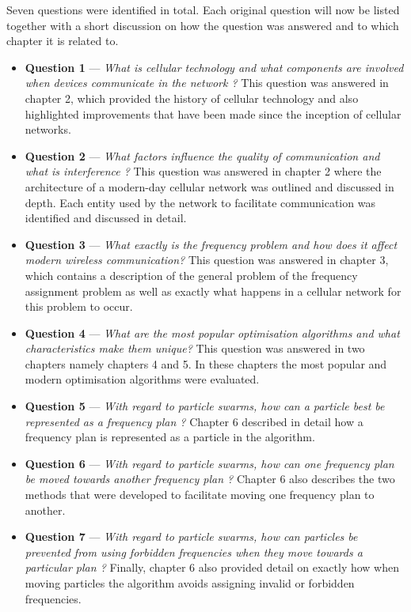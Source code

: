 Seven questions were identified in total. Each original question will now be listed together with a short discussion on how the question was answered and to which chapter it is related to.
\begin{itemize}
\item \textbf{Question 1} --- \emph{What is cellular technology and what components are involved when devices communicate in the network ?} This question was answered in chapter 2, which provided the history of cellular technology and also highlighted improvements that have been made since the inception of cellular networks.
\item \textbf{Question 2} --- \emph{What factors influence the quality of communication and what is interference ?} This question was answered in chapter 2 where the architecture of a modern-day cellular network was outlined and discussed in depth. Each entity used by the network to facilitate communication was identified and discussed in detail.
\item \textbf{Question 3} --- \emph{What exactly is the frequency problem and how does it affect modern wireless communication? } This question was answered in chapter 3, which contains a description of the general problem of the frequency assignment problem as well as exactly what happens in a cellular network for this problem to occur.
\item \textbf{Question 4} --- \emph{What are the most popular optimisation algorithms and what characteristics make them unique?} This question was answered in two chapters namely chapters 4 and 5. In these chapters the most popular and modern optimisation algorithms were evaluated.
\item \textbf{Question 5} --- \emph{With regard to particle swarms, how can a particle best be represented as a frequency plan ?} Chapter 6 described in detail how a frequency plan is represented as a particle in the algorithm.
\item \textbf{Question 6} --- \emph{With regard to particle swarms, how can one frequency plan be moved towards another frequency plan ?} Chapter 6 also describes the two methods that were developed to facilitate moving one frequency plan to another.
\item \textbf{Question 7} --- \emph{With regard to particle swarms, how can particles be prevented from using forbidden frequencies when they move towards a particular plan ?} Finally, chapter 6 also provided detail on exactly how when moving particles the algorithm avoids assigning invalid or forbidden frequencies.
\end{itemize}

